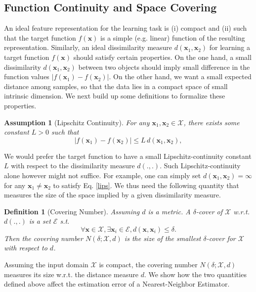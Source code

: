 \documentclass{article}
\newtheorem{definition}{Definition}
\newtheorem{assumption}{Assumption}
\newcommand{\cE}{\mathcal{E}}
\newcommand{\X}{\mathcal{X}}
\newcommand{\1}{\mathbf{1}}
\newcommand{\bx}{\boldsymbol{x}}
\begin{document}
\subsection{Function Continuity and Space Covering}

An ideal feature representation for the learning task is (i) compact and (ii) such that the target function $f(\bx)$ is a simple (e.g. linear) function of the resulting representation. Similarly, an ideal dissimilarity measure $d(\bx_1,\bx_2)$ for learning a target function $f(\bx)$ should satisfy certain properties. On the one hand, a small dissimilarity $d(\bx_1,\bx_2)$ between two objects should imply small difference in the function values $|f(\bx_1)-f(\bx_2)|$. On the other hand, we want a small expected distance among samples, so that the data lies in a compact space of small intrinsic dimension. We next build up some definitions to formalize these properties. 

\begin{assumption}[Lipschitz Continuity]\label{assume:lip}
For any $\bx_1, \bx_2 \in \X$, there exists some constant $L>0$ such that
\begin{equation}\label{lips}
|f(\bx_1)-f(\bx_2)| \leq L \, d(\bx_1,\bx_2),
\end{equation}
\end{assumption}

We would prefer the target function to have a small Lipschitz-continuity constant $L$ with respect to the dissimilarity measure $d(.,.)$. Such Lipschitz-continuity alone however might not suffice. For example, one can simply set $d(\bx_1,\bx_2)=\infty$ for any $\bx_1\neq \bx_2$ to satisfy Eq. \eqref{lips}. We thus need the following quantity that measures the size of the space implied by a given dissimilarity measure.

\begin{definition}[Covering Number]\label{def:cover}
Assuming $d$ is a \emph{metric}. A $\delta$-cover of $\X$ w.r.t. $d(.,.)$ is a set $\cE$ s.t. 
$$
\forall \bx\in\X, \exists \bx_i\in\cE, d(\bx,\bx_i)\leq \delta.
$$ 
Then the covering number $N(\delta; \X,d)$ is the size of the smallest $\delta$-cover for $\X$with respect to $d$.
\end{definition}

Assuming the input domain $\X$ is compact, the covering number $N(\delta; \X,d)$ measures its size w.r.t. the distance measure $d$. We show how the two quantities defined above affect the estimation error of a Nearest-Neighbor Estimator.
\end{document}
